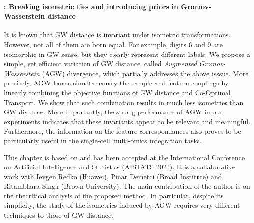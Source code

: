 \paragraph{: Breaking isometric ties and introducing priors in
Gromov-Wasserstein distance}

It is known that GW distance is invariant under isometric transformations. However,
not all of them are born equal. For example, digits 6 and 9 are isomorphic in GW sense,
but they clearly represent different labels. We propose a simple,
yet efficient variation of GW distance, called \textit{Augmented Gromov-Wasserstein} (AGW) divergence,
which partially addresses the above isssue.
More precisely, AGW learns simultaneously the sample and feature couplings by
linearly combining the objective functions of GW distance and Co-Optimal Transport.
We show that such combination results in much less isometries than GW distance.
More importantly, the strong performance of AGW in our experiments indicates
that these invariants appear to be relevant and meaningful.
Furthermore, the information on the feature correspondances also proves to be particularly useful
in the single-cell multi-omics integration tasks.

This chapter is based on \citep{Demetci23} and has been accepted at the
International Conference on Artificial Intelligence and Statistics (AISTATS 2024).
It is a collaborative work with Ievgen Redko (Huawei), Pinar Demetci (Broad Institute)
and Ritambhara Singh (Brown University). The main contribution of the author is on the
theoritical analysis of the proposed method. In particular, despite its simplicity,
the study of the isometries induced by AGW requires very different techniques
to those of GW distance.